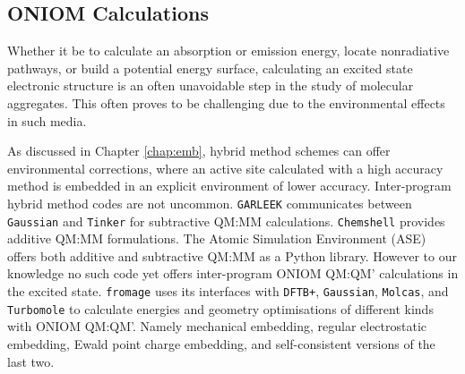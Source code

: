 

\subsection{ONIOM Calculations}
\label{sec:prog_oniom}
Whether it be to calculate an absorption or emission energy, locate nonradiative pathways, or build a potential energy surface, calculating an excited state electronic structure is an often unavoidable step in the study of molecular aggregates. This often proves to be challenging due to the environmental effects in such media.

As discussed in Chapter \ref{chap:emb}, hybrid method schemes can offer environmental corrections, where an active site calculated with a high accuracy method is embedded in an explicit environment of lower accuracy. Inter-program hybrid method codes are not uncommon. \texttt{GARLEEK}\cite{Pedregal2018} communicates between \texttt{Gaussian} and \texttt{Tinker} for subtractive QM:MM calculations. \texttt{Chemshell}\cite{Metz2014,Lu2019} provides additive QM:MM formulations. The Atomic Simulation Environment (ASE)\cite{Larsen2017} offers both additive and subtractive QM:MM as a Python library. However to our knowledge no such code yet offers inter-program ONIOM QM:QM' calculations in the excited state. \texttt{fromage} uses its interfaces with \texttt{DFTB+}, \texttt{Gaussian}, \texttt{Molcas}, and \texttt{Turbomole} to calculate energies and geometry optimisations of different kinds with ONIOM QM:QM'. Namely mechanical embedding, regular electrostatic embedding, Ewald point charge embedding, and self-consistent versions of the last two.

